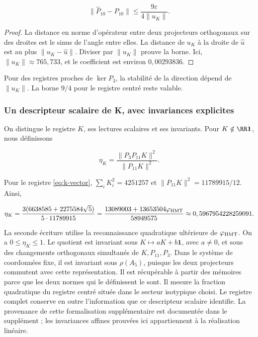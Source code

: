 \begin{equation}
\boxed{
\|\widehat P_{10}-P_{10}\|
\le\frac{9\varepsilon}{4\|u_K\|}.
}
\label{nuc11:eq:15}
\end{equation}



\begin{proof}
La distance en norme d’opérateur entre deux projecteurs orthogonaux
sur des droites est le sinus de l’angle entre elles.
La distance de \(u_K\) à la droite de \(\widehat u\) est au plus
\(\|u_K-\widehat u\|\). Diviser par \(\|u_K\|\) prouve la borne.
Ici, \(\|u_K\|\approx765{,}733\), et le coefficient est
environ \(0{,}00293836\).
\end{proof}
Pour des registres proches de \(\ker P_3\), la stabilité de la
direction dépend de \(\|u_K\|\).
La borne \(9/4\) pour le registre centré reste valable.


\subsubsection{Un descripteur scalaire de K, avec invariances explicites}

On distingue le registre \(K\), ses lectures scalaires et ses
invariants. Pour \(K\notin\RR\mathbf1\), nous définissons




\begin{equation}
\eta_K=\frac{\|P_3P_{11}K\|^2}{\|P_{11}K\|^2}.
\label{nuc11:eq:16}
\end{equation}



Pour le registre \eqref{eq:k-vector},
\(\sum_iK_i^2=4251257\) et
\(\|P_{11}K\|^2=11789915/12\). Ainsi,



\begin{equation}
\eta_K=
\frac{3(6638585+2275584\sqrt5)}{5\cdot11789915}
=\frac{13089003+13653504\varphi_{\rm HMT}}{58949575}
\approx0,5967954228259091.
\label{nuc11:eq:17}
\end{equation}



La seconde écriture utilise la reconnaissance quadratique ultérieure
de \(\varphi_{\rm HMT}\).
On a \(0\le\eta_K\le1\).
Le quotient est invariant sous
\(K\mapsto aK+b\mathbf1\), avec \(a\ne0\), et sous des changements
orthogonaux simultanés de \(K,P_{11},P_3\).
Dans le système de coordonnées fixe, il est invariant sous \(\rho(A_5)\), puisque les deux
projecteurs commutent avec cette représentation.
Il est récupérable à partir des mémoires parce que les deux normes qui le
définissent le sont.
Il mesure la fraction quadratique du registre centré située dans le
secteur isotypique choisi.
Le registre complet conserve en outre l’information que ce
descripteur scalaire identifie.
La provenance de cette formalisation supplémentaire est documentée dans
le supplément ; les invariances affines prouvées ici appartiennent
à la réalisation linéaire.

